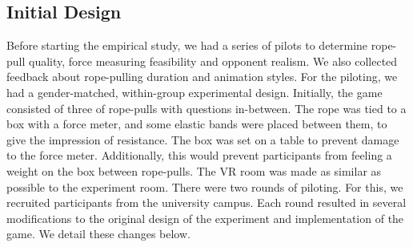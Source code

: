 \subsection{Initial Design}
\label{subsection:initDesign}
Before starting the empirical study, we had a series of pilots to determine rope-pull quality, force measuring feasibility and opponent realism. We also collected feedback about rope-pulling duration and animation styles.
For the piloting, we had a gender-matched, within-group experimental design. Initially, the game consisted of three of rope-pulls with questions in-between. The rope was tied to a box with a force meter, and some elastic bands were placed between them, to give the impression of resistance. The box was set on a table to prevent damage to the force meter. Additionally, this would prevent participants from feeling a weight on the box between rope-pulls. The VR room was made as similar as possible to the experiment room. There were two rounds of piloting. For this, we recruited participants from the university campus. Each round resulted in several modifications to the original design of the experiment and implementation of the game. We detail these changes below.
